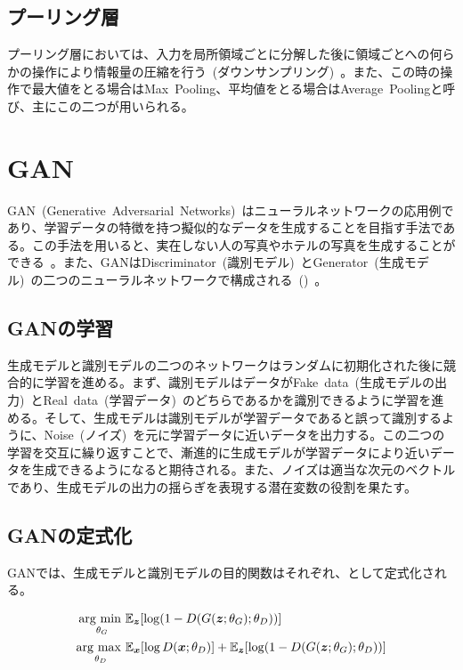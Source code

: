\clearpage

\subsection{プーリング層}

プーリング層においては、入力を局所領域ごとに分解した後に領域ごとへの何らかの操作により情報量の圧縮を行う~(ダウンサンプリング)~。また、この時の操作で最大値をとる場合はMax~Pooling、平均値をとる場合はAverage~Poolingと呼び、主にこの二つが用いられる。

\section{GAN}

GAN~(Generative~Adversarial~Networks)~\cite{GAN}はニューラルネットワークの応用例であり、学習データの特徴を持つ擬似的なデータを生成することを目指す手法である。この手法を用いると、実在しない人の写真やホテルの写真を生成することができる~\cite{DCGAN}。また、GANはDiscriminator~(識別モデル)~とGenerator~(生成モデル)~の二つのニューラルネットワークで構成される~()~。

\subsection{GANの学習}

生成モデルと識別モデルの二つのネットワークはランダムに初期化された後に競合的に学習を進める。まず、識別モデルはデータがFake~data~(生成モデルの出力)~とReal~data~(学習データ)~のどちらであるかを識別できるように学習を進める。そして、生成モデルは識別モデルが学習データであると誤って識別するように、Noise~(ノイズ)~を元に学習データに近いデータを出力する。この二つの学習を交互に繰り返すことで、漸進的に生成モデルが学習データにより近いデータを生成できるようになると期待される。また、ノイズは適当な次元のベクトルであり、生成モデルの出力の揺らぎを表現する潜在変数の役割を果たす。

\subsection{GANの定式化}

GANでは、生成モデルと識別モデルの目的関数はそれぞれ、として定式化される。

\begin{align}
    \label{eq:GAN_G}
    \mathop{\mathrm{arg~min~}}\limits _{\theta_G}& \mathbb{E}_{\boldsymbol{z}}[\log (1-D(G(\boldsymbol{z};\theta_G);\theta_D))]\\
    \label{eq:GAN_D}
    \mathop{\mathrm{arg~max~}}\limits _{\theta_D}& \mathbb{E}_{\boldsymbol{x}}[\log D(\boldsymbol{x};\theta_D)]+\mathbb{E}_{\boldsymbol{z}}[\log (1-D(G(\boldsymbol{z};\theta_G);\theta_D))]
\end{align}



